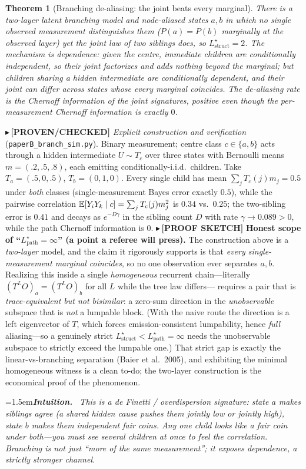 \documentclass[11pt]{article}
\newtheorem{theorem}{Theorem}
\newcommand{\PROVEN}[1]{{\color{teal}\small$\blacktriangleright$\,\textbf{[PROVEN/CHECKED]} #1}}
\newcommand{\SKETCH}[1]{{\color{orange}\small$\blacktriangleright$\,\textbf{[PROOF SKETCH]} #1}}
\newenvironment{intuition}{\par\smallskip\noindent\hangindent=1.5em\textbf{\itshape Intuition.}\itshape\ \ignorespaces}{\par\smallskip}
\begin{document}
\begin{theorem}[Branching de-aliasing: the joint beats every marginal]\label{thm:branch}
There is a two-layer latent branching model and node-aliased states $a,b$ in which \emph{no single observed
measurement distinguishes them} ($P(a)=P(b)$ marginally at the observed layer) yet the joint law of two siblings
does, so $L^\star_{\mathrm{struct}}=2$. The mechanism is dependence: given the centre, \emph{immediate} children
are conditionally independent, so their joint factorizes and adds nothing beyond the marginal; but children
sharing a hidden intermediate are conditionally dependent, and their joint can differ across states whose every
marginal coincides. The de-aliasing rate is the Chernoff information of the joint signatures, positive even though
the per-measurement Chernoff information is exactly $0$.
\end{theorem}
\PROVEN{\emph{Explicit construction and verification} (\texttt{paperB\_branch\_sim.py}). Binary measurement;
centre class $c\in\{a,b\}$ acts through a hidden intermediate $U\sim T_c$ over three states with Bernoulli means
$m=(.2,.5,.8)$, each emitting conditionally-i.i.d.\ children. Take $T_a=(.5,0,.5)$, $T_b=(0,1,0)$. Every
single child has mean $\sum_j T_c(j)m_j=0.5$ under \emph{both} classes (single-measurement Bayes error exactly
$0.5$), while the pairwise correlation $\mathbb{E}[Y_iY_k\mid c]=\sum_j T_c(j)m_j^2$ is $0.34$ vs.\ $0.25$; the two-sibling
error is $0.41$ and decays as $e^{-D\gamma}$ in the sibling count $D$ with rate $\gamma\to0.089>0$, while the path
Chernoff information is $0$.}
\SKETCH{\textbf{Honest scope of ``$L^\star_{\mathrm{path}}=\infty$'' (a point a referee will press).} The
construction above is a \emph{two-layer} model, and the claim it rigorously supports is that \emph{every
single-measurement marginal coincides}, so no one observation ever separates $a,b$. Realizing this inside a single
\emph{homogeneous} recurrent chain---literally $(T^{L}O)_a=(T^{L}O)_b$ for all $L$ while the tree law differs---
requires a pair that is \emph{trace-equivalent but not bisimilar}: a zero-sum direction in the \emph{unobservable}
subspace that is \emph{not} a lumpable block. (With the naive route the direction is a left eigenvector of $T$,
which forces emission-consistent lumpability, hence \emph{full} aliasing---so a genuinely strict
$L^\star_{\mathrm{struct}}<L^\star_{\mathrm{path}}=\infty$ needs the unobservable subspace to strictly exceed the
lumpable one.) That strict gap is exactly the linear-vs-branching separation (Baier et al.\ 2005), and exhibiting
the minimal homogeneous witness is a clean to-do; the two-layer construction is the economical proof of the
phenomenon.}
\begin{intuition}
This is a de Finetti / overdispersion signature: state $a$ makes siblings \emph{agree} (a shared hidden cause
pushes them jointly low or jointly high), state $b$ makes them independent fair coins. Any one child looks like a
fair coin under both---you must see \emph{several children at once} to feel the correlation. Branching is not just
``more of the same measurement''; it exposes dependence, a strictly stronger channel.
\end{intuition}
\end{document}
